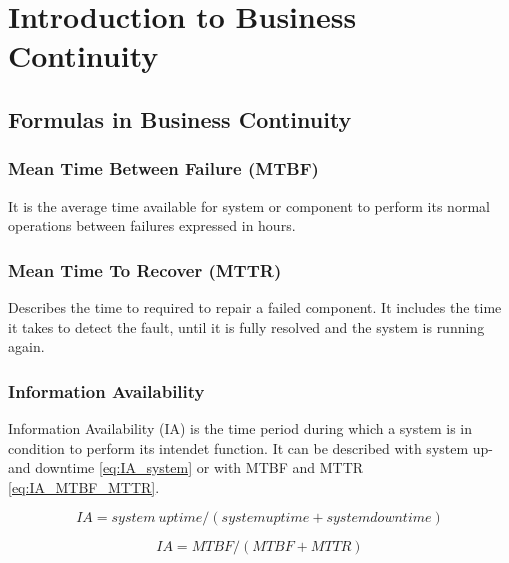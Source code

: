 \section{Introduction to Business Continuity} %
\label{sec:introduction_to_business_continuity}

\subsection{Formulas in Business Continuity} %
\label{sub:formulas_in_business_continuity}

	\subsubsection{Mean Time Between Failure (MTBF)} %
	\label{ssub:mean_time_between_failure}
		It is the average time available for system or component
		to perform its normal operations between failures expressed in hours.

	\subsubsection{Mean Time To Recover (MTTR)} %
	\label{ssub:mean_time_to_recover}
		Describes the time to required to repair a failed component.
		It includes the time it takes to detect the fault,
		until it is fully resolved
		and the system is running again.

	\subsubsection{Information Availability} %
	\label{ssub:availability}
		Information Availability (IA) is the time period during
		which a system is in condition to perform its intendet function.
		It can be described with system up- and downtime \ref{eq:IA_system}
		or with MTBF and MTTR \ref{eq:IA_MTBF_MTTR}.
		
		\begin{equation}
			IA = system\ uptime/(system uptime + system downtime)
		\end{equation}
		\label{eq:IA_system}

		\begin{equation}
			IA = MTBF/(MTBF + MTTR)
		\end{equation}
		\label{eq:IA_MTBF_MTTR}
